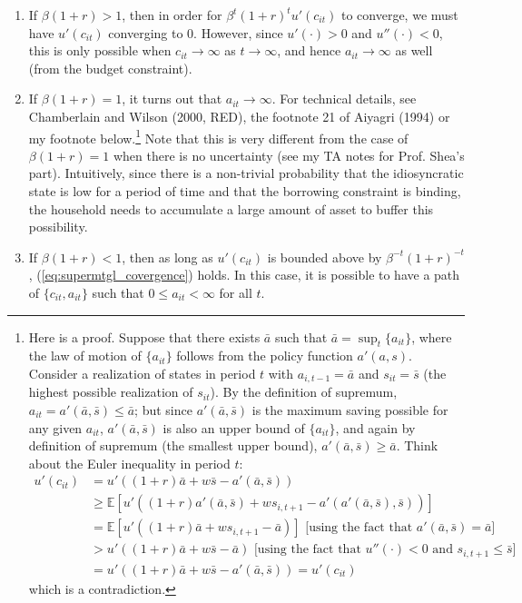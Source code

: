 \documentclass[12pt]{article}
\begin{document}
\begin{enumerate}
\item If $\beta(1+r) > 1$, then in order for $\beta^t (1+r)^t u'(c_{it})$ to converge, we must have $u'(c_{it})$ converging to 0. However, since $u'(\cdot) > 0$ and $u''(\cdot) < 0$, this is only possible when $c_{it} \to \infty$ as $t \to \infty$, and hence $a_{it} \to \infty$ as well (from the budget constraint).
\item If $\beta (1+r) = 1$, it turns out that $a_{it} \to \infty$. For technical details, see Chamberlain and Wilson (2000, RED), the footnote 21 of Aiyagri (1994) or my footnote below.\footnote{Here is a proof. Suppose that there exists $\bar{a}$ such that $\bar{a} = \sup_{t} \{a_{it}\}$, where the law of motion of $\{a_{it}\}$ follows from the policy function $a'(a,s)$. Consider a realization of states in period $t$ with $a_{i,t-1} = \bar{a}$ and $s_{it} = \bar{s}$ (the highest possible realization of $s_{it}$). By the definition of supremum, $a_{it} = a'(\bar{a}, \bar{s}) \leq \bar{a}$; but since $a'(\bar{a}, \bar{s})$ is the maximum saving possible for any given $a_{it}$, $a'(\bar{a}, \bar{s})$ is also an upper bound of $\{a_{it}\}$, and again by definition of supremum (the smallest upper bound), $a'(\bar{a}, \bar{s}) \geq \bar{a}$. Think about the Euler inequality in period $t$:
\begin{align*}
	u'(c_{it}) & = u'((1+r) \bar{a} + w \bar{s} - a'(\bar{a}, \bar{s}))\\
	& \geq \mathbb{E}[u'((1+r) a'(\bar{a}, \bar{s}) + w s_{i,t+1} - a'(a'(\bar{a}, \bar{s}), \bar{s}))] \\
	& = \mathbb{E}[u'((1+r) \bar{a} + w s_{i,t+1} - \bar{a})] \text{ [using the fact that $a'(\bar{a},\bar{s}) = \bar{a}$]} \\
	& > u'((1+r) \bar{a} + w \bar{s} - \bar{a}) \text{ [using the fact that $u''(\cdot) < 0$ and $s_{i,t+1} \leq \bar{s}$]} \\
	& = u'((1+r) \bar{a} + w \bar{s} - a'(\bar{a}, \bar{s})) = u'(c_{it})
\end{align*}
which is a contradiction.
} Note that this is very different from the case of $\beta (1+r) = 1$ when there is no uncertainty (see my TA notes for Prof. Shea's part). Intuitively, since there is a non-trivial probability that the idiosyncratic state is low for a period of time and that the borrowing constraint is binding, the household needs to accumulate a large amount of asset to buffer this possibility. 
\item If $\beta (1+r) < 1$, then as long as $u'(c_{it})$ is bounded above by $\beta^{-t} (1+r)^{-t}$, (\ref{eq:supermtgl_covergence}) holds. In this case, it is possible to have a path of $\{c_{it}, a_{it}\}$ such that $0 \leq a_{it} < \infty$ for all $t$. 
\end{enumerate}
\end{document}
